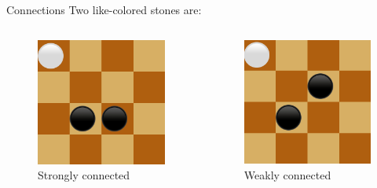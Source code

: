 \documentclass{beamer}
\begin{document}
     \begin{frame}{Connections}
     Two like-colored stones are:
     \vspace{0.5cm}
    \begin{columns}
			\begin{figure}
				\includegraphics[scale=0.35]{images/strong.png}
				\caption*{Strongly connected}
			\end{figure}
					
			\begin{figure}
				\includegraphics[scale=0.35]{images/weak.png}
				\caption*{Weakly connected}
			\end{figure}
		

\end{columns}
\end{frame}
\end{document}

